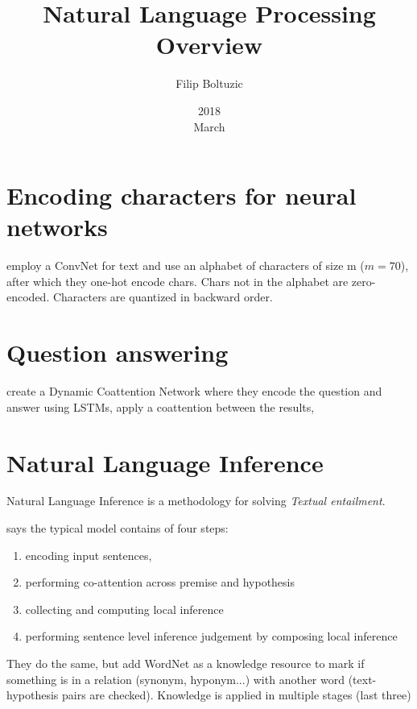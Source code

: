 \documentclass[a4paper,10pt]{article}
\title{Natural Language Processing Overview}
\author{Filip Boltuzic}
\date{2018 \\ March}
\begin{document}
\maketitle


\section{Encoding characters for neural networks}

\cite{Zhang2015} employ a ConvNet for text and use an alphabet of 
characters of size m ($m=70$), after which they one-hot encode chars. 
Chars not in the alphabet are zero-encoded. Characters are quantized 
in backward order.

\section{Question answering}

\cite{Xiong2016} create a Dynamic Coattention Network where they encode 
the question and answer using LSTMs, apply a coattention between the results, 

\section{Natural Language Inference}

Natural Language Inference is a methodology for solving \emph{Textual entailment}.

\noindent \cite{Chen2017} says the typical model contains of four steps:
\begin{enumerate}
  \item encoding input sentences, 
  \item performing co-attention across premise and hypothesis
  \item collecting and computing local inference
  \item performing sentence level inference judgement by composing local inference
\end{enumerate}
They do the same, but add WordNet as a knowledge resource to mark if something is in a
relation (synonym, hyponym...) with another word (text-hypothesis pairs are checked). 
Knowledge is applied in multiple stages (last three)




\end{document}
